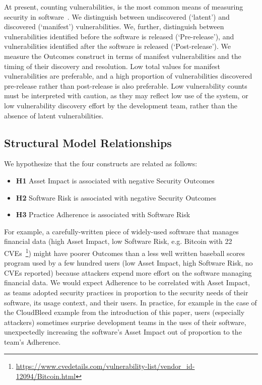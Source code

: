  At present, counting vulnerabilities, is the most common means of measuring security in software~\cite{morrison2014mapping}. We distinguish between undiscovered (`latent') and discovered (`manifest') vulnerabilities. We, further, distinguish between vulnerabilities identified before the software is released (`Pre-release'), and vulnerabilities identified after the software is released (`Post-release'). 
We measure the Outcomes construct in terms of manifest vulnerabilities and the timing of their discovery and resolution. Low total values for manifest vulnerabilities are preferable, and a high proportion of vulnerabilities discovered pre-release rather than post-release is also preferable. Low vulnerability counts must be interpreted with caution, as they may reflect low use of the system, or low vulnerability discovery effort by the development team, rather than the absence of latent vulnerabilities. 

\subsection{Structural Model Relationships}
We hypothesize that the four constructs are related as follows:
\begin{itemize}
	\item \textbf{H1} Asset Impact is associated with negative Security Outcomes
	\item \textbf{H2} Software Risk is associated with negative Security Outcomes
	\item \textbf{H3} Practice Adherence is associated with Software Risk 	
\end{itemize}

For example, a carefully-written piece of widely-used software that manages financial data (high Asset Impact, low Software Risk, e.g. Bitcoin with 22 CVEs~\footnote{\url{https://www.cvedetails.com/vulnerability-list/vendor_id-12094/Bitcoin.html}}) might have poorer Outcomes than a less well written baseball scores program used by a few hundred users (low Asset Impact, high Software Risk, no CVEs reported) because attackers expend more effort on the software managing financial data. We would expect Adherence to be correlated with Asset Impact, as teams adopted security practices in proportion to the security needs of their software, its usage context, and their users. In practice, for example in the case of the CloudBleed example from the introduction of this paper, users (especially attackers) sometimes surprise development teams in the uses of their software, unexpectedly increasing the software's Asset Impact out of proportion to the team's Adherence. 

